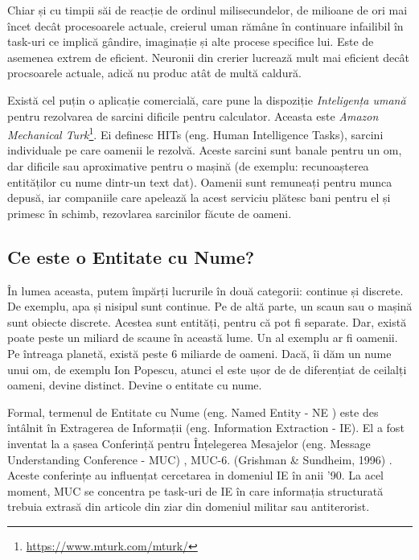Chiar și cu timpii săi de reacție de ordinul milisecundelor, de milioane de ori mai încet decât procesoarele actuale, creierul uman rămâne în continuare infailibil în task-uri ce implică gândire, imaginație și alte procese specifice lui. Este de asemenea extrem de eficient. Neuronii din crerier lucrează mult mai eficient decât procsoarele actuale, adică nu produc atât de multă caldură.

Există cel puțin o aplicație comercială, care pune la dispoziție \textit{Inteligența umană} pentru rezolvarea de sarcini dificile pentru calculator. Aceasta este \textit{Amazon Mechanical Turk}\footnote{\url{https://www.mturk.com/mturk/}}. Ei definesc HITs (eng. Human Intelligence Tasks), sarcini individuale pe care oamenii le rezolvă. Aceste sarcini sunt banale pentru un om, dar dificile sau aproximative pentru o mașină (de exemplu: recunoașterea entităților cu nume dintr-un text dat). Oamenii sunt remuneați pentru munca depusă, iar companiile care apelează la acest serviciu plătesc bani pentru el și primesc în schimb, rezovlarea sarcinilor făcute de oameni.

\subsection{Ce este o Entitate cu Nume?}

În lumea aceasta, putem împărți lucrurile în două categorii: continue și discrete. De exemplu, apa și nisipul sunt continue. Pe de altă parte, un scaun sau o mașină sunt obiecte discrete. Acestea sunt entități, pentru că pot fi separate. Dar, există poate peste un miliard de scaune în această lume. Un al exemplu ar fi oamenii. Pe întreaga planetă, există peste 6 miliarde de oameni. Dacă, îi dăm un nume unui om, de exemplu Ion Popescu, atunci el este ușor de de diferențiat de ceilalți oameni, devine distinct. Devine o entitate cu nume.

 
Formal, termenul de Entitate cu Nume (eng. Named Entity - NE )  este des întâlnit în Extragerea de Informații (eng. Information Extraction - IE). El a fost inventat la a șasea Conferință pentru Înțelegerea Mesajelor (eng. Message Understanding Conference - MUC)
, MUC-6. (Grishman \& Sundheim, 1996) \cite{grishman1996}. Aceste conferințe au influențat cercetarea in domeniul IE în anii '90. La acel moment, MUC se concentra pe task-uri de IE în care informația structurată trebuia extrasă din articole din ziar din domeniul militar sau antiterorist.


